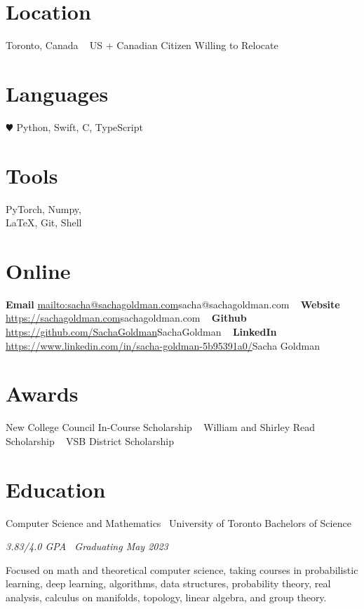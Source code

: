 \documentclass[]{style}
\begin{document}

\begin{aside} %
\section{Location}
Toronto, Canada
~ \vspace{-2mm}
US + Canadian Citizen 
Willing to Relocate
\section{Languages}
{\color{red} $\varheartsuit$} Python, Swift, 
C, TypeScript
\section{Tools}
PyTorch, Numpy, \\ \LaTeX, Git, Shell
\section{Online}
\textbf{Email}
\url{mailto:sacha@sachagoldman.com}{sacha@sachagoldman.com} 
~ \vspace{-2mm}
\textbf{Website} 
\url{https://sachagoldman.com}{sachagoldman.com} 
~ \vspace{-2mm}
\textbf{Github}
\url{https://github.com/SachaGoldman}{SachaGoldman}
~ \vspace{-2mm}
\textbf{LinkedIn}
\url{https://www.linkedin.com/in/sacha-goldman-5b95391a0/}{Sacha Goldman}
\section{Awards}
New College Council 
In-Course Scholarship
~ \vspace{-1mm}
William and Shirley Read 
Scholarship
~ \vspace{-1mm}
VSB District Scholarship
\end{aside}

\section{Education}

\begin{entrylist}

\entry
{Computer Science and Mathematics \ {\normalfont University of Toronto}}
{Bachelors of Science}
{\emph{3.83/4.0 GPA \ Graduating May 2023}
~ \vspace{1mm}

Focused on math and theoretical computer science, taking courses in probabilistic learning, deep learning, algorithms, data structures, probability theory, real analysis, calculus on manifolds, topology, linear algebra, and group theory.}

\end{entrylist}
\end{document}
